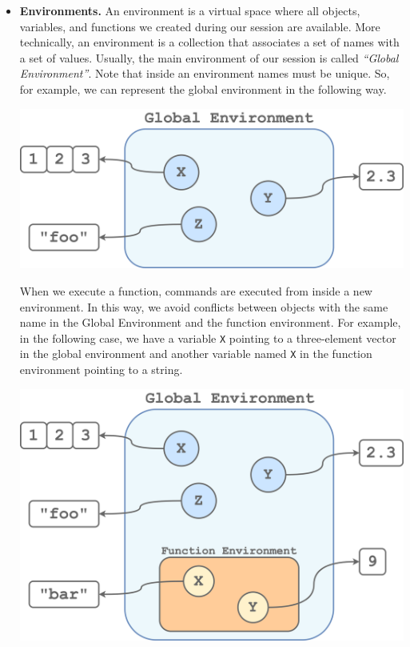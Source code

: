 \documentclass[
  11pt,
]{book}
\begin{document}
\begin{itemize}
\item
  \textbf{Environments.} An environment is a virtual space where all objects, variables, and functions we created during our session are available. More technically, an environment is a collection that associates a set of names with a set of values. Usually, the main environment of our session is called \emph{``Global Environment''}. Note that inside an environment names must be unique. So, for example, we can represent the global environment in the following way.

  \begin{center}\includegraphics[width=0.95\linewidth]{images/coding/glob-env-2} \end{center}

  When we execute a function, commands are executed from inside a new environment. In this way, we avoid conflicts between objects with the same name in the Global Environment and the function environment. For example, in the following case, we have a variable \texttt{X} pointing to a three-element vector in the global environment and another variable named \texttt{X} in the function environment pointing to a string.

  \begin{center}\includegraphics[width=0.95\linewidth]{images/coding/fun-env} \end{center}


\end{itemize}
\end{document}

